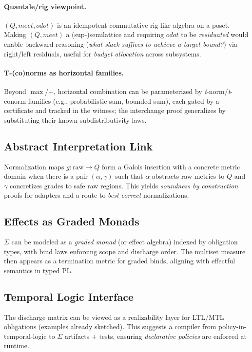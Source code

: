 \documentclass[11pt]{article}
\theoremstyle{plain}
\theoremstyle{definition}
\theoremstyle{remark}
\def\Q{Q}%
\def\Sig{\Sigma}%
\def\vmeet{meet}%
\def\hplus{odot}%
\DeclareRobustCommand{\Q}{\texorpdfstring{\ensuremath{\mathcal{Q}}}{Q}}     %
\DeclareRobustCommand{\Sig}{\texorpdfstring{\ensuremath{\Sigma}}{\Sigma}}   %
\newcommand{\vmeet}{\wedge}                    %
\newcommand{\hplus}{\odot}                     %
\def\Q{Q}%
\def\Sig{\Sigma}%
\def\vmeet{meet}%
\def\hplus{odot}%
\begin{document}
\paragraph{Quantale/rig viewpoint.}
$(\Q,\vmeet,\hplus)$ is an idempotent commutative rig-like algebra on a poset. Making $(\Q,\vmeet)$ a (sup-)semilattice and requiring $\hplus$ to be \emph{residuated} would enable backward reasoning (\emph{what slack suffices to achieve a target bound?}) via right/left residuals, useful for \emph{budget allocation} across subsystems.

\paragraph{T-(co)norms as horizontal families.}
Beyond $\max$/$+$, horizontal combination can be parameterized by \emph{t}-norm/\emph{t}-conorm families (e.g., probabilistic sum, bounded sum), each gated by a \Sig{} certificate and tracked in the witness; the interchange proof generalizes by substituting their known subdistributivity laws.

\subsection{Abstract Interpretation Link}
Normalization maps $g:\text{raw}\to\Q$ form a Galois insertion with a concrete metric domain when there is a pair $(\alpha,\gamma)$ such that $\alpha$ abstracts raw metrics to $\Q$ and $\gamma$ concretizes grades to safe raw regions. This yields \emph{soundness by construction} proofs for adapters and a route to \emph{best correct} normalizations.

\subsection{Effects as Graded Monads}
$\Sig$ can be modeled as a \emph{graded monad} (or effect algebra) indexed by obligation types, with bind laws enforcing scope and discharge order. The multiset measure then appears as a termination metric for graded binds, aligning with effectful semantics in typed PL.

\subsection{Temporal Logic Interface}
The discharge matrix can be viewed as a realizability layer for LTL/MTL obligations (examples already sketched). This suggests a compiler from policy-in-temporal-logic to $\Sig$ artifacts + tests, ensuring \emph{declarative policies} are enforced at runtime.
\end{document}
